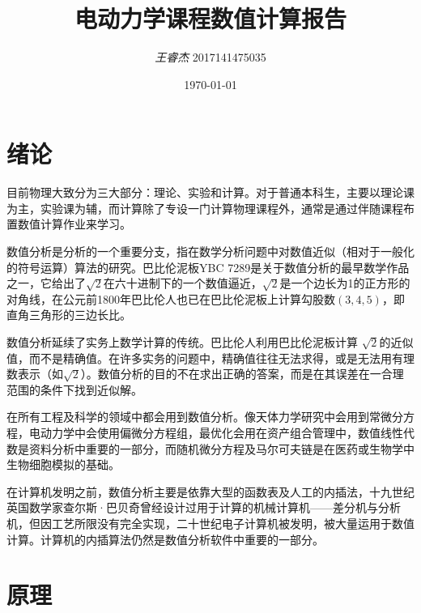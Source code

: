 \documentclass[UTF8,a4paper,10pt]{ctexart}
\title{\textbf{电动力学课程数值计算报告}}
\author{\textit{王睿杰} 2017141475035}
\date{\today}
\begin{document}
\begin{multicols}{2}
    [\maketitle]
    \section{绪论}
        目前物理大致分为三大部分：理论、实验和计算。对于普通本科生，主要以理论课为主，实验课为辅，而计算除了专设一门计算物理课程外，通常是通过伴随课程布置数值计算作业来学习。\par
        数值分析是分析的一个重要分支，指在数学分析问题中对数值近似（相对于一般化的符号运算）算法的研究。巴比伦泥板YBC 7289是关于数值分析的最早数学作品之一，它给出了$\sqrt {2}$在六十进制下的一个数值逼近，$\sqrt {2}$是一个边长为1的正方形的对角线，在公元前1800年巴比伦人也已在巴比伦泥板上计算勾股数$(3,4,5)$，即直角三角形的三边长比。\par
        数值分析延续了实务上数学计算的传统。巴比伦人利用巴比伦泥板计算 $\sqrt {2}$的近似值，而不是精确值。在许多实务的问题中，精确值往往无法求得，或是无法用有理数表示（如$\sqrt {2}$）。数值分析的目的不在求出正确的答案，而是在其误差在一合理范围的条件下找到近似解。\par
        在所有工程及科学的领域中都会用到数值分析。像天体力学研究中会用到常微分方程，电动力学中会使用偏微分方程组，最优化会用在资产组合管理中，数值线性代数是资料分析中重要的一部分，而随机微分方程及马尔可夫链是在医药或生物学中生物细胞模拟的基础。\par
        在计算机发明之前，数值分析主要是依靠大型的函数表及人工的内插法，十九世纪英国数学家查尔斯·巴贝奇曾经设计过用于计算的机械计算机——差分机与分析机，但因工艺所限没有完全实现，二十世纪电子计算机被发明，被大量运用于数值计算。计算机的内插算法仍然是数值分析软件中重要的一部分。\par
    \section{原理}

\end{multicols}
\end{document}
